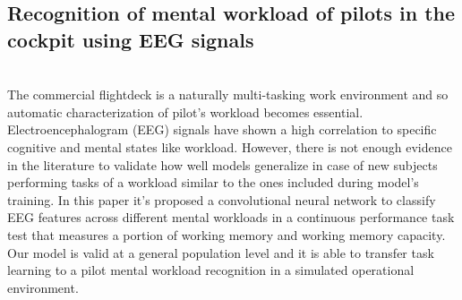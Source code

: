 \subsection{Recognition of mental workload of pilots in the cockpit using EEG signals}
\leavevmode\\
The commercial flightdeck is a naturally multi-tasking work environment and so automatic characterization of pilot’s workload becomes essential. Electroencephalogram (EEG) signals have shown a high correlation to specific cognitive and mental states like workload. However, there is not enough evidence in the literature to validate how well models generalize in case of new subjects performing tasks of a workload similar to the ones included during model’s training. In this paper it’s proposed a convolutional neural network to classify EEG features across different mental workloads in a continuous performance task test that measures a portion of working memory and working memory capacity. Our model is valid at a general population level and it is able to transfer task learning to a pilot mental workload recognition in a simulated operational environment.
\\